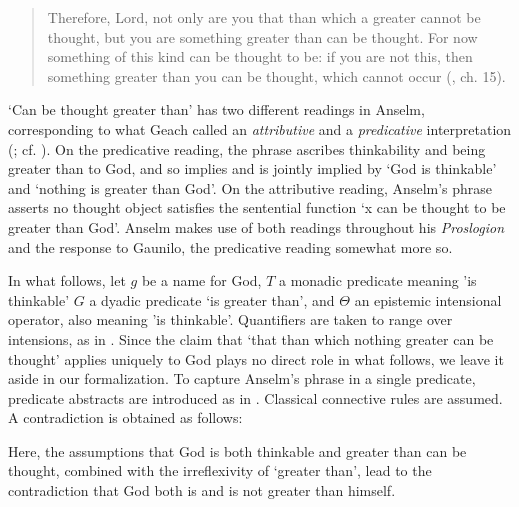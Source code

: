 \documentclass[]{birkjour}
\begin{document}
\begin{quote}
Therefore, Lord, not only are you that than which a greater cannot be thought, but you are something greater than can be thought. For now something of this kind can be thought to be: if you are not this, then something greater than you can be thought, which cannot occur (\cite{AnselmPros}, ch. 15).
\end{quote}
	
`Can be thought greater than' has two different readings in Anselm, corresponding to what Geach called an \textit{attributive} and a \textit{predicative} interpretation (\cite{Geach1956}; cf. \cite{Thomson1997,Almotahari2015}). On the predicative reading, the phrase ascribes thinkability and being greater than to God, and so implies and is jointly implied by `God is thinkable' and `nothing is greater than God'. On the attributive reading, Anselm's phrase asserts no thought object satisfies the sentential function `x can be thought to be greater than God'. Anselm makes use of both readings throughout his \textit{Proslogion} and the response to Gaunilo, the predicative reading somewhat more so. 
	
In what follows, let $g$ be a name for God, $T$ a monadic predicate meaning 'is thinkable'  $G$ a dyadic predicate `is greater than', and $\Theta$ an epistemic intensional operator, also meaning 'is thinkable'. Quantifiers are taken to range over intensions, as in \cite{CIFOL2,CIFOL1}. Since the claim that `that than which nothing greater can be thought' applies uniquely to God plays no direct role in what follows, we leave it aside in our formalization. To capture Anselm's phrase in a single predicate, predicate abstracts are introduced as in \cite{Fitting1998}. Classical connective rules are assumed. A contradiction is obtained as follows:
	
	

Here, the assumptions that God is both thinkable and greater than can be thought, combined with the irreflexivity of `greater than', lead to the contradiction that God both is and is not greater than himself.
	
\end{document}
